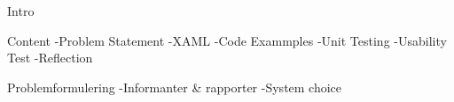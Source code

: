 Intro


Content
-Problem Statement
-XAML
-Code Exammples
-Unit Testing
-Usability Test
-Reflection





Problemformulering
-Informanter \& rapporter
-System choice
